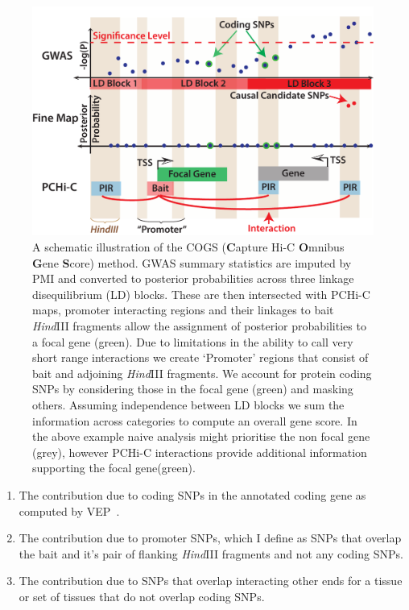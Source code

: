 \documentclass[a4paper,11pt]{report}
\begin{document}
\begin{figure}[h]
\includegraphics[width=\textwidth]{cogs3.pdf}
\caption{A schematic illustration of the COGS (\textbf{C}apture Hi-C \textbf{O}mnibus \textbf{G}ene \textbf{S}core)  method. GWAS summary statistics are imputed by PMI and converted to posterior probabilities across three linkage disequilibrium (LD) blocks. These are then intersected with PCHi-C maps, promoter interacting regions and their linkages to bait \textit{Hind}III fragments allow the assignment of posterior probabilities to a focal gene (green). Due to limitations in the ability to call very short range interactions we create `Promoter' regions that consist of bait and adjoining \textit{Hind}III fragments. We account for protein coding SNPs by considering those in the focal gene (green) and masking others. Assuming independence between LD blocks we sum the information across categories to compute an overall gene score. In the above example naive analysis might prioritise the non focal gene (grey), however PCHi-C interactions provide additional information supporting the focal gene(green).}
\label{fig:cogs}
\centering
\end{figure}

\begin{enumerate}
\item The contribution due to coding SNPs in the annotated coding gene as computed by VEP~\citep{McLaren2010-ne}.
\item The contribution due to promoter SNPs, which I define as SNPs that overlap the bait and it's pair of flanking \textit{Hind}III fragments and not any coding SNPs.
\item The contribution due to SNPs that overlap interacting other ends for a tissue or set of tissues that do not overlap coding SNPs. 
\end{enumerate}
\end{document}
